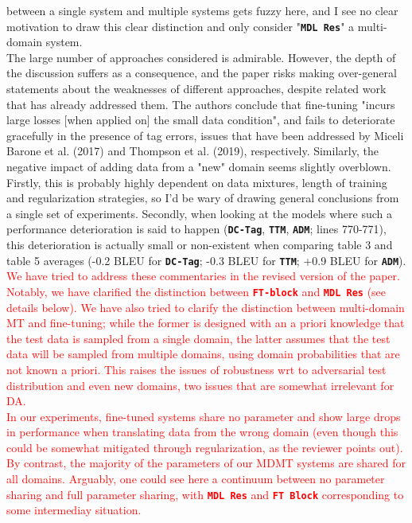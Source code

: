 \documentclass[12pt,times,a4paper,twoside]{article}
\theoremstyle{definition}
\newcommand{\system}[1]{\texttt{\textbf{#1}}}
\begin{document}
between a single system and multiple systems gets fuzzy here, and I see no clear motivation to draw this clear distinction and only consider "\system{MDL Res}" a multi-domain system.
\\
The large number of approaches considered is admirable. However, the depth of the discussion suffers as a consequence, and the paper risks making over-general statements about the weaknesses of different approaches, despite related work that has already addressed them. The authors conclude that fine-tuning "incurs large losses [when applied on] the small data condition", and fails to deteriorate gracefully in the presence of tag errors, issues that have been addressed by Miceli Barone et al. (2017) and Thompson et al. (2019), respectively. Similarly, the negative impact of adding data from a "new" domain seems slightly overblown. Firstly, this is probably highly dependent on data mixtures, length of training and regularization strategies, so I'd be wary of drawing general conclusions from a single set of experiments. Secondly, when looking at the models where such a performance deterioration is said to happen (\system{DC-Tag}, \system{TTM}, \system{ADM}; lines 770-771), this deterioration is actually small or non-existent when comparing table 3 and table 5 averages (-0.2 BLEU for \system{DC-Tag}; -0.3 BLEU for \system{TTM}; +0.9 BLEU for \system{ADM}).
\\
\textcolor{red}{%
  We have tried to address these commentaries in the revised version of the paper. Notably, we have clarified the distinction between \system{FT-block} and \system{MDL Res} (see details below). We have also tried to clarify the distinction between multi-domain MT and fine-tuning; while the former is designed with an a priori knowledge that the test data is sampled from a single domain, the latter assumes that the test data will be sampled from multiple domains, using domain probabilities that are not known a priori. This raises the issues of robustness wrt to adversarial test distribution and even new domains, two issues that are somewhat irrelevant for DA.
\\
In our experiments, fine-tuned systems share no parameter and show large drops in performance when translating data from the wrong domain (even though this could be somewhat mitigated through regularization, as the reviewer points out). By contrast, the majority of the parameters of our MDMT systems are shared for all domains. Arguably, one could see here a continuum between no parameter sharing and full parameter sharing, with \system{MDL Res} and \system{FT Block} corresponding to some intermediay situation. 
}
\end{document}
